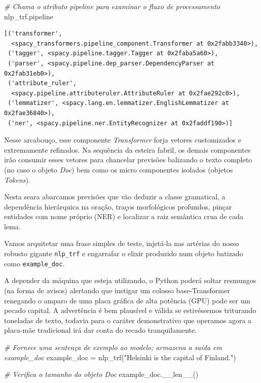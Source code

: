 \documentclass[
  brazilian,
]{article}
\newenvironment{Shaded}{}{}
\newcommand{\CommentTok}[1]{\textcolor[rgb]{0.38,0.63,0.69}{\textit{#1}}}
\newcommand{\FunctionTok}[1]{\textcolor[rgb]{0.02,0.16,0.49}{#1}}
\newcommand{\NormalTok}[1]{#1}
\newcommand{\OperatorTok}[1]{\textcolor[rgb]{0.40,0.40,0.40}{#1}}
\newcommand{\StringTok}[1]{\textcolor[rgb]{0.25,0.44,0.63}{#1}}
\begin{document}
\begin{Shaded}
\begin{Highlighting}[]
\CommentTok{\# Chama o atributo \textquotesingle{}pipeline\textquotesingle{} para examinar o fluxo de processamento}
\NormalTok{nlp\_trf.pipeline}
\end{Highlighting}
\end{Shaded}

\begin{verbatim}
[('transformer',
  <spacy_transformers.pipeline_component.Transformer at 0x2fabb3340>),
 ('tagger', <spacy.pipeline.tagger.Tagger at 0x2faba5a60>),
 ('parser', <spacy.pipeline.dep_parser.DependencyParser at 0x2fab31eb0>),
 ('attribute_ruler',
  <spacy.pipeline.attributeruler.AttributeRuler at 0x2fae292c0>),
 ('lemmatizer', <spacy.lang.en.lemmatizer.EnglishLemmatizer at 0x2fae36840>),
 ('ner', <spacy.pipeline.ner.EntityRecognizer at 0x2faddf190>)]
\end{verbatim}

Nesse arcabouço, esse componente \emph{Transformer} forja vetores
customizados e extremamente refinados. Na sequência da esteira fabril,
os demais componentes irão consumir esses vetores para chancelar
previsões balizando o texto completo (no caso o objeto \emph{Doc}) bem
como os micro componentes isolados (objetos \emph{Tokens}).

Nesta seara abarcamos previsões que vão deduzir a classe gramatical, a
dependência hierárquica na oração, traços morfológicos profundos, pinçar
entidades com nome próprio (NER) e localizar a raiz semântica crua de
cada lema.

Vamos arquitetar uma frase simples de teste, injetá-la nas artérias do
nosso robusto gigante \texttt{nlp\_trf} e engarrafar o elixir produzido
num objeto batizado como \texttt{example\_doc}.

A depender da máquina que esteja utilizando, o Python poderá soltar
resmungos (na forma de avisos) alertando que instigar um colosso
base-Transformer renegando o amparo de uma placa gráfica de alta
potência (GPU) pode ser um pecado capital. A advertência é bem plausível
e válida se estivéssemos triturando toneladas de texto, todavia para o
caráter demonstrativo que operamos agora a placa-mãe tradicional irá dar
conta do recado tranquilamente.

\begin{Shaded}
\begin{Highlighting}[]
\CommentTok{\# Fornece uma sentença de exemplo ao modelo; armazena a saída em \textquotesingle{}example\_doc\textquotesingle{}}
\NormalTok{example\_doc }\OperatorTok{=}\NormalTok{ nlp\_trf(}\StringTok{"Helsinki is the capital of Finland."}\NormalTok{)}

\CommentTok{\# Verifica o tamanho do objeto Doc}
\NormalTok{example\_doc.}\FunctionTok{\_\_len\_\_}\NormalTok{()}
\end{Highlighting}
\end{Shaded}
\end{document}
